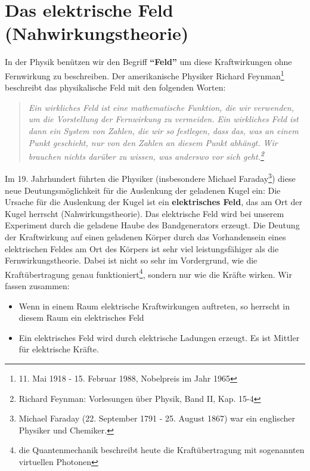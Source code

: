 \documentclass[11pt,twoside=false,open=any]{scrbook}
\begin{document}
\section{Das elektrische Feld (Nahwirkungstheorie)}
In der Physik benützen wir den Begriff \textbf{``Feld''} um diese Kraftwirkungen ohne Fernwirkung zu beschreiben. Der amerikanische Physiker Richard Feynman\footnote{11. Mai 1918 - 15. Februar 1988, Nobelpreis im Jahr 1965} beschreibt das physikalische Feld mit den folgenden Worten:
	\begin{quote}
\textit{Ein wirkliches Feld ist eine mathematische Funktion, die wir verwenden, um die Vorstellung der Fernwirkung zu vermeiden. Ein wirkliches Feld ist dann ein System von Zahlen, die wir so festlegen, dass das, was an einem Punkt geschieht, nur von den Zahlen an diesem Punkt abhängt. Wir brauchen nichts darüber zu wissen, was anderswo vor sich geht.\footnote{Richard Feynman: Vorlesungen über Physik, Band II, Kap. 15-4}}
	\end{quote}
Im 19. Jahrhundert führten die Physiker (insbesondere Michael Faraday\footnote{Michael Faraday (22. September 1791 - 25. August 1867) war ein englischer  Physiker  und Chemiker.}) diese neue Deutungsmöglichkeit für die Auslenkung der geladenen Kugel ein: Die Ursache für die Auslenkung der Kugel ist ein \textbf{elektrisches Feld}, das am Ort der Kugel herrscht (Nahwirkungstheorie). Das elektrische Feld wird bei unserem Experiment durch die geladene Haube des Bandgenerators erzeugt. Die Deutung der Kraftwirkung auf einen geladenen Körper durch das Vorhandensein eines elektrischen Feldes am Ort des Körpers ist sehr viel leistungsfähiger als die Fernwirkungstheorie. Dabei ist nicht so sehr im Vordergrund, wie die Kraftübertragung genau funktioniert\footnote{die Quantenmechanik beschreibt heute die Kraftübertragung mit sogenannten virtuellen Photonen}, sondern nur wie die Kräfte wirken. Wir fassen zusammen:

\begin{itemize}
	\item Wenn in einem Raum elektrische Kraftwirkungen auftreten, so herrscht in diesem Raum ein elektrisches Feld
	\item Ein elektrisches Feld wird durch elektrische Ladungen erzeugt. Es ist Mittler für elektrische Kräfte.
\end{itemize}
\end{document}

